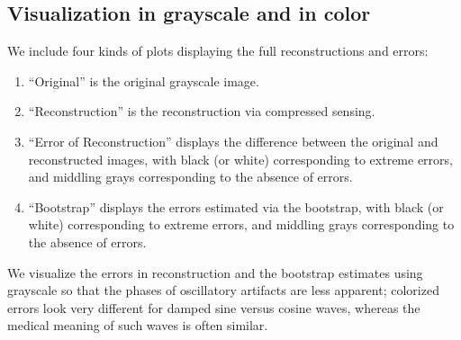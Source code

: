 \documentclass[article]{jdssv}
\begin{document}
\subsection{Visualization in grayscale and in color}
\label{viz}

We include four kinds of plots displaying the full reconstructions
and errors:
%
\begin{enumerate}
\item ``Original'' is the original grayscale image.
\item ``Reconstruction'' is the reconstruction via compressed sensing.
\item ``Error of Reconstruction'' displays the difference
between the original and reconstructed images, with black (or white)
corresponding to extreme errors, and middling grays
corresponding to the absence of errors.
\item ``Bootstrap'' displays the errors estimated via the bootstrap,
with black (or white) corresponding to extreme errors,
and middling grays corresponding to the absence of errors.
\end{enumerate}

We visualize the errors in reconstruction and the bootstrap estimates
using grayscale so that the phases of oscillatory artifacts are less apparent;
colorized errors look very different for damped sine versus cosine waves,
whereas the medical meaning of such waves is often similar.
\end{document}
